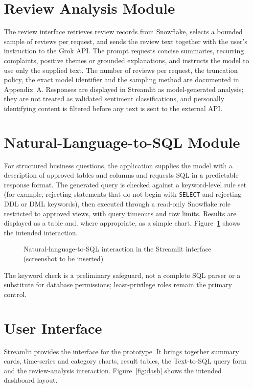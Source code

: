 \documentclass[12pt,a4paper]{report}
\begin{document}
\section{Review Analysis Module}
The review interface retrieves review records from Snowflake, selects a bounded sample of reviews per request, and sends the review text together with the user's instruction to the Grok API. The prompt requests concise summaries, recurring complaints, positive themes or grounded explanations, and instructs the model to use only the supplied text. The number of reviews per request, the truncation policy, the exact model identifier and the sampling method are documented in Appendix~A. Responses are displayed in Streamlit as model-generated analysis; they are not treated as validated sentiment classifications, and personally identifying content is filtered before any text is sent to the external API.

\section{Natural-Language-to-SQL Module}
For structured business questions, the application supplies the model with a description of approved tables and columns and requests SQL in a predictable response format. The generated query is checked against a keyword-level rule set (for example, rejecting statements that do not begin with \texttt{SELECT} and rejecting DDL or DML keywords), then executed through a read-only Snowflake role restricted to approved views, with query timeouts and row limits. Results are displayed as a table and, where appropriate, as a simple chart. Figure~\ref{fig:t2s} shows the intended interaction.

\begin{figure}[htbp]
\centering
{}
\caption{Natural-language-to-SQL interaction in the Streamlit interface (screenshot to be inserted)}
\label{fig:t2s}
\end{figure}

The keyword check is a preliminary safeguard, not a complete SQL parser or a substitute for database permissions; least-privilege roles remain the primary control.

\section{User Interface}
Streamlit provides the interface for the prototype. It brings together summary cards, time-series and category charts, result tables, the Text-to-SQL query form and the review-analysis interaction. Figure~\ref{fig:dash} shows the intended dashboard layout.
\end{document}
